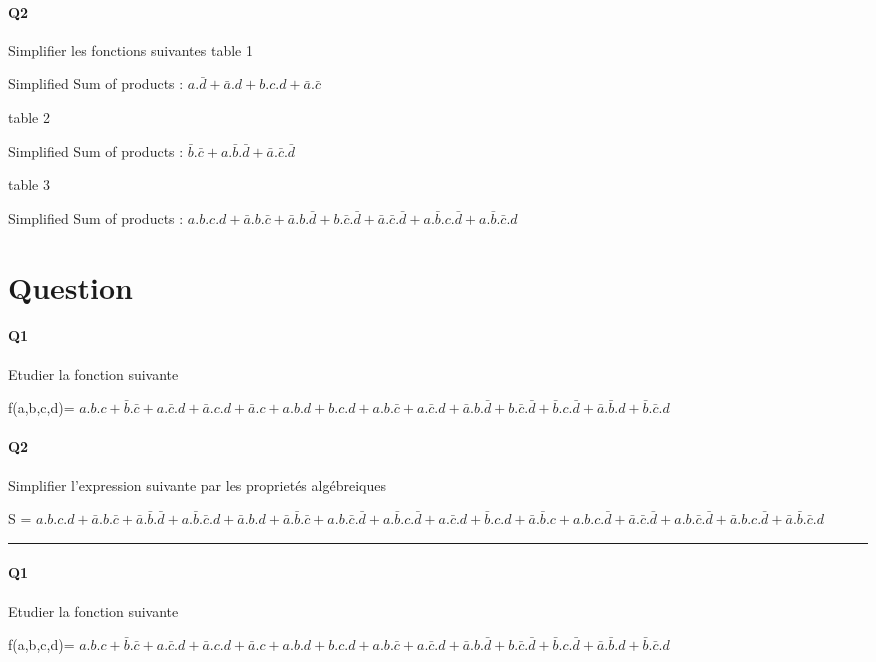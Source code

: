 \paragraph{Q2}

Simplifier les fonctions suivantes
table 1

Simplified Sum of products : $a.\bar d+\bar a.d+b.c.d+\bar a.\bar c$

table 2

Simplified Sum of products : $\bar b.\bar c+a.\bar b.\bar d+\bar a.\bar c.\bar d$

table 3

Simplified Sum of products : $a.b.c.d+\bar a.b.\bar c+\bar a.b.\bar d+b.\bar c.\bar d+\bar a.\bar c.\bar d+a.\bar b.c.\bar d+a.\bar b.\bar c.d$

\pagebreak
\section{Question}

\paragraph{Q1}

Etudier la fonction suivante

f(a,b,c,d)= $a.b.c+\bar b.\bar c+a.\bar c.d+\bar a.c.d + \bar a.c+a.b.d+b.c.d+a.b.\bar c+a.\bar c.d+\bar a.b.\bar d+b.\bar c.\bar d+\bar b.c.\bar d+\bar a.\bar b.d+\bar b.\bar c.d$

\paragraph{Q2}

Simplifier l'expression suivante par les proprietés algébreiques 

S = $a.b.c.d+\bar a.b.\bar c+\bar a.\bar b.\bar d+a.\bar b.\bar c.d + \bar a.b.d+\bar a.\bar b.\bar c+a.b.\bar c.\bar d+a.\bar b.c.\bar d + a.\bar c.d+\bar b.c.d+\bar a.\bar b.c+a.b.c.\bar d+\bar a.\bar c.\bar d + a.b.\bar c.\bar d+\bar a.b.c.\bar d+\bar a.\bar b.\bar c.d$

\hrule width 1\linewidth
\paragraph{Q1}

Etudier la fonction suivante

f(a,b,c,d)= $a.b.c+\bar b.\bar c+a.\bar c.d+\bar a.c.d + \bar a.c+a.b.d+b.c.d+a.b.\bar c+a.\bar c.d+\bar a.b.\bar d+b.\bar c.\bar d+\bar b.c.\bar d+\bar a.\bar b.d+\bar b.\bar c.d$

